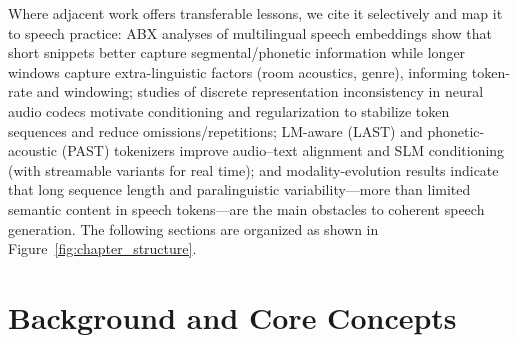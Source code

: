 \documentclass{article}
\begin{document}
Where adjacent work offers transferable lessons, we cite it selectively and map it to speech practice: ABX analyses of multilingual speech embeddings show that short snippets better capture segmental/phonetic information while longer windows capture extra-linguistic factors (room acoustics, genre), informing token-rate and windowing; studies of discrete representation inconsistency in neural audio codecs motivate conditioning and regularization to stabilize token sequences and reduce omissions/repetitions; LM-aware (LAST) and phonetic-acoustic (PAST) tokenizers improve audio--text alignment and SLM conditioning (with streamable variants for real time); and modality-evolution results indicate that long sequence length and paralinguistic variability---more than limited semantic content in speech tokens---are the main obstacles to coherent speech generation. \cite{har-tuv2025pastphoneticacousticspeechtokenizer,turetzky2024lastlanguagemodelawarespeechtokenization,fily2024establishingdegreesclosenessbetweenaudio,wang2024whydospeechlanguagemodelsfailgeneratesem,liu2024analyzingmitigatinginconsistencydiscrete}The following sections are organized as shown in Figure~\ref{fig:chapter_structure}.

















\section{Background and Core Concepts} \label{sec:backgroundandcoreconcepts}
\end{document}
